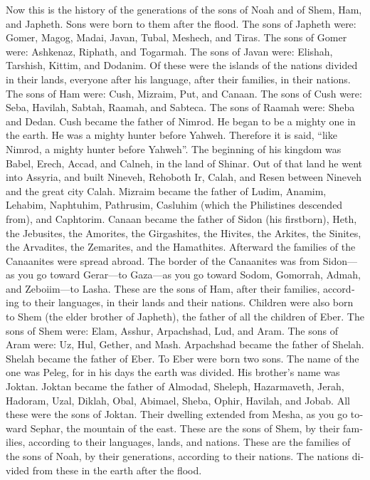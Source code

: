 \begin{paracol}{2}
\begin{otherlanguage}{english}
 Now this is the history of the generations of the sons of
Noah and of Shem, Ham, and Japheth. Sons were born to them after the
flood.  The sons of Japheth were: Gomer, Magog, Madai,
Javan, Tubal, Meshech, and Tiras.  The sons of Gomer were:
Ashkenaz, Riphath, and Togarmah.  The sons of Javan were:
Elishah, Tarshish, Kittim, and Dodanim.  Of these were the
islands of the nations divided in their lands, everyone after his
language, after their families, in their nations.  The
sons of Ham were: Cush, Mizraim, Put, and Canaan.  The
sons of Cush were: Seba, Havilah, Sabtah, Raamah, and Sabteca. The sons
of Raamah were: Sheba and Dedan.  Cush became the father
of Nimrod. He began to be a mighty one in the earth.  He
was a mighty hunter before Yahweh. Therefore it is said, ``like Nimrod,
a mighty hunter before Yahweh''.  The beginning of his
kingdom was Babel, Erech, Accad, and Calneh, in the land of Shinar.
 Out of that land he went into Assyria, and built
Nineveh, Rehoboth Ir, Calah,  and Resen between Nineveh
and the great city Calah.  Mizraim became the father of
Ludim, Anamim, Lehabim, Naphtuhim,  Pathrusim, Casluhim
(which the Philistines descended from), and Caphtorim. 
Canaan became the father of Sidon (his firstborn), Heth, 
the Jebusites, the Amorites, the Girgashites,  the
Hivites, the Arkites, the Sinites,  the Arvadites, the
Zemarites, and the Hamathites. Afterward the families of the Canaanites
were spread abroad.  The border of the Canaanites was
from Sidon---as you go toward Gerar---to Gaza---as you go toward Sodom,
Gomorrah, Admah, and Zeboiim---to Lasha.  These are the
sons of Ham, after their families, according to their languages, in
their lands and their nations.  Children were also born
to Shem (the elder brother of Japheth), the father of all the children
of Eber.  The sons of Shem were: Elam, Asshur,
Arpachshad, Lud, and Aram.  The sons of Aram were: Uz,
Hul, Gether, and Mash.  Arpachshad became the father of
Shelah. Shelah became the father of Eber.  To Eber were
born two sons. The name of the one was Peleg, for in his days the earth
was divided. His brother's name was Joktan.  Joktan
became the father of Almodad, Sheleph, Hazarmaveth, Jerah,
 Hadoram, Uzal, Diklah,  Obal, Abimael,
Sheba,  Ophir, Havilah, and Jobab. All these were the
sons of Joktan.  Their dwelling extended from Mesha, as
you go toward Sephar, the mountain of the east.  These
are the sons of Shem, by their families, according to their languages,
lands, and nations.  These are the families of the sons
of Noah, by their generations, according to their nations. The nations
divided from these in the earth after the flood.


\end{otherlanguage}
\end{paracol}
